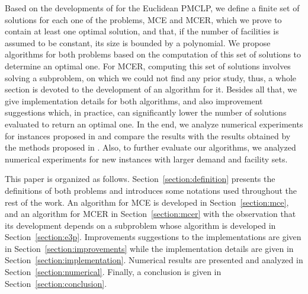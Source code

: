 Based on the developments of \cite{church:1984} for the Euclidean PMCLP, we define a finite set of solutions for each one of the problems, MCE and MCER, which we prove to contain at least one optimal solution, and that, if the number of facilities is assumed to be constant, its size is bounded by a polynomial.
We propose algorithms for both problems based on the computation of this set of solutions to determine an optimal one.
For MCER, computing this set of solutions involves solving a subproblem, on which we could not find any prior study, thus, a whole section is devoted to the development of an algorithm for it.
Besides all that, we give implementation details for both algorithms, and also improvement suggestions which, in practice, can significantly lower the number of solutions evaluated to return an optimal one.
In the end, we analyze numerical experiments for instances proposed in \cite{canbolat, andreta} and compare the results with the results obtained by the methods proposed in \cite{andreta}. Also, to further {\color{blue}evaluate} our algorithms, we analyzed numerical experiments for new instances with larger demand and facility sets.

{\color{Red}
This paper is organized as follows. Section~\ref{section:definition} presents the definitions of both problems and introduces some notations used throughout the rest of the work. An algorithm for MCE is developed in Section~\ref{section:mce}, and an algorithm for MCER in Section~\ref{section:mcer} with the observation that its development depends on a subproblem whose algorithm is developed in Section~\ref{section:e3p}. Improvements suggestions to the implementations are given in Section~\ref{section:improvements} while the implementation details are given in Section~\ref{section:implementation}. Numerical results are presented and analyzed in Section~\ref{section:numerical}. Finally, a conclusion is given in Section~\ref{section:conclusion}.
}